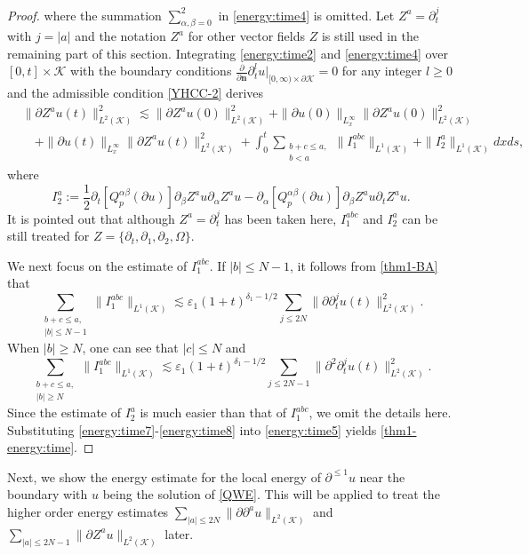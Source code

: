 \documentclass[11pt,twoside]{article}
\def\cK{\mathcal K}
\def\ds{\displaystyle}
\def\p{\partial}
\def\ve{\varepsilon}
\def\ls{\lesssim}
\def\bn{\mathbf{n}}
\theoremstyle{plain}
\theoremstyle{definition}
\numberwithin{equation}{section}
\begin{document}
\begin{proof}
where the summation $\ds\sum_{\alpha,\beta=0}^2$ in \eqref{energy:time4} is omitted.
Let $Z^a=\p_t^j$ with $j=|a|$ and the notation $Z^a$ for other vector fields $Z$ is still used in the remaining part of this section.
Integrating \eqref{energy:time2} and \eqref{energy:time4} over $[0,t]\times\cK$
with the boundary conditions $\frac{\p}{\p\bn}\p_t^lu|_{[0,\infty)\times\p\cK}=0$ for any integer $l\ge0$ and the admissible
condition \eqref{YHCC-2} derives
\begin{equation}\label{energy:time5}
\begin{split}
&\|\p Z^au(t)\|^2_{L^2(\cK)}
\ls\|\p Z^au(0)\|^2_{L^2(\cK)}+\|\p u(0)\|_{L_x^\infty}\|\p Z^au(0)\|^2_{L^2(\cK)}\\
&\quad+\|\p u(t)\|_{L_x^\infty}\|\p Z^au(t)\|^2_{L^2(\cK)}
+\int_0^t\sum_{\substack{b+c\le a,\\b<a}}\|I_1^{abc}\|_{L^1(\cK)}+\|I_2^a\|_{L^1(\cK)}dxds,
\end{split}
\end{equation}
where
\begin{equation}\label{energy:time6}
I_2^a:=\frac12\p_t[Q_p^{\alpha\beta}(\p u)]\p_{\beta}Z^au\p_{\alpha}Z^au
-\p_{\alpha}[Q_p^{\alpha\beta}(\p u)]\p_{\beta}Z^au\p_tZ^au.
\end{equation}
It is pointed out that although $Z^a=\p_t^j$ has been taken here, $I_1^{abc}$ and $I_2^a$ can be still
treated for $Z=\{\p_t,\p_1,\p_2,\Omega\}$.

We next focus on the estimate of $I_1^{abc}$.
If $|b|\le N-1$, it follows from \eqref{thm1-BA} that
\begin{equation}\label{energy:time7}
\sum_{\substack{b+c\le a,\\|b|\le N-1}}\|I_1^{abc}\|_{L^1(\cK)}
\ls\ve_1(1+t)^{\delta_1-1/2}\sum_{j\le2N}\|\p\p_t^ju(t)\|^2_{L^2(\cK)}.
\end{equation}
When $|b|\ge N$, one can see that $|c|\le N$ and
\begin{equation}\label{energy:time8}
\sum_{\substack{b+c\le a,\\|b|\ge N}}\|I_1^{abc}\|_{L^1(\cK)}
\ls\ve_1(1+t)^{\delta_1-1/2}\sum_{j\le2N-1}\|\p^2\p_t^ju(t)\|^2_{L^2(\cK)}.
\end{equation}
Since the estimate of $I_2^a$ is much easier than that of $I_1^{abc}$, we omit the details here.
Substituting \eqref{energy:time7}-\eqref{energy:time8} into \eqref{energy:time5} yields \eqref{thm1-energy:time}.
\end{proof}

Next, we show the energy estimate for the local energy of  $\p^{\le1}u$ near the boundary
with $u$ being the solution of \eqref{QWE}. This will be applied to treat the higher order
energy estimates $\ds\sum_{|a|\le2N}\|\p\p^au\|_{L^2(\cK)}$ and $\ds\sum_{|a|\le2N-1}\|\p Z^au\|_{L^2(\cK)}$ later.
\end{document}
